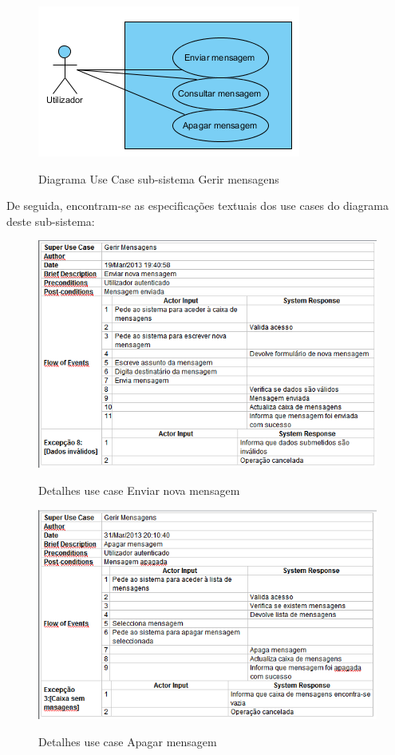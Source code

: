 ﻿\documentclass[12pt,a4paper]{article}
\begin{document}
\begin{figure}[h!]
\centering
\includegraphics[scale=1]{usecase/U_GerirMensagens}
\label{usecase}
\caption{Diagrama Use Case sub-sistema Gerir mensagens}
\end{figure}

De seguida, encontram-se as especificações textuais dos use cases do diagrama deste sub-sistema:\\

\begin{figure}[h!]
\centering
\includegraphics[scale=0.7]{d_usecase/enviarmensagem}
\label{usecase}
\caption{Detalhes use case Enviar nova mensagem}
\end{figure}

\begin{figure}[h!]
\centering
\includegraphics[scale=0.7]{d_usecase/apagarmensagem}
\label{usecase}
\caption{Detalhes use case Apagar mensagem}
\end{figure}
\end{document}

